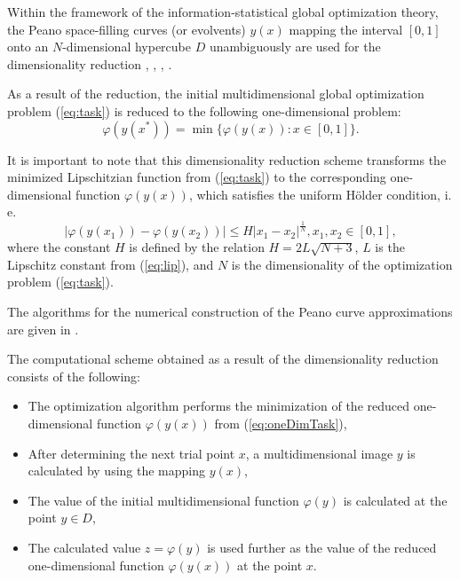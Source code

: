 \documentclass[runningheads]{llncs}
\begin{document}
Within the framework of the information-statistical global optimization theory,
the Peano space-filling curves (or evolvents) \(y(x)\) mapping the interval \([0,1]\)
onto an \(N\)-dimensional hypercube \(D\) unambiguously are used for the dimensionality
reduction \cite{sergeyevStronginLera2013}, \cite{strongin1978}, \cite{stronginGergelBarkalovParGO}, \cite{strSergGO}.
\par
As a result of the reduction, the initial multidimensional global optimization
problem (\ref{eq:task}) is reduced to the following one-dimensional problem:
\begin{equation}
\label{eq:oneDimTask}
\varphi(y(x^*))=\min\{\varphi(y(x)):x\in [0,1]\}.
\end{equation}
\par
It is important to note that this dimensionality reduction scheme transforms the minimized
Lipschitzian function from (\ref{eq:task}) to the corresponding one-dimensional
function \(\varphi(y(x))\), which satisfies the uniform H{\"o}lder condition, i. e.
\begin{equation}
\label{eq:holder}
|\varphi(y(x_1))-\varphi(y(x_2))|\leq H{|x_1-x_2|}^{\frac{1}{N}}, x_1,x_2\in[0,1],
\end{equation}
where the constant $H$ is defined by the relation \(H=2L\sqrt{N+3}\), \(L\) is the Lipschitz
constant from (\ref{eq:lip}), and \(N\) is the dimensionality of the optimization problem (\ref{eq:task}).
\par
The algorithms for the numerical construction of the Peano curve approximations are
given in \cite{strSergGO}.

\par
The computational scheme obtained as a result of the dimensionality reduction consists of the following:
\begin{itemize}
  \item The optimization algorithm performs the minimization of the reduced one-dimensional
  function \(\varphi(y(x))\) from (\ref{eq:oneDimTask}),
  \item After determining the next trial point \(x\), a multidimensional image \(y\) is calculated by using the
mapping \(y(x)\),
  \item The value of the initial multidimensional function \(\varphi(y)\) is calculated at the point \(y\in D\),
  \item The calculated value \(z=\varphi(y)\) is used further as the value of the reduced one-dimensional function \(\varphi(y(x))\) at the point \(x\).
\end{itemize}
\end{document}
